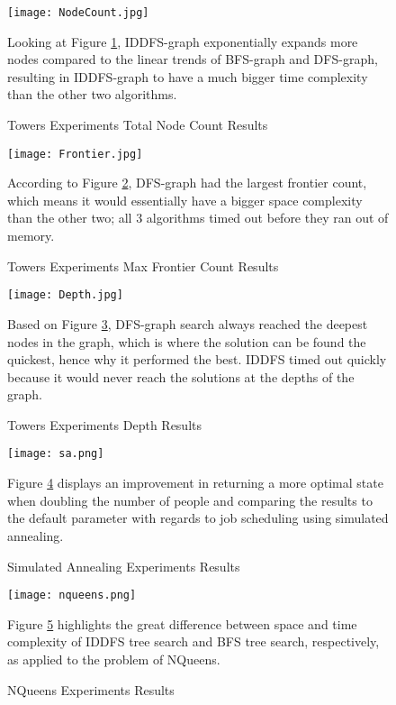 \documentclass[11pt]{article}
\begin{document}
\begin{figure}[!h]
{\centering
\texttt{[image: NodeCount.jpg]}
\caption{Towers Experiments Total Node Count Results}
\label{tower_node}
}
\vspace*{5mm}
Looking at Figure \ref{tower_node}, IDDFS-graph exponentially expands more nodes compared to the linear trends of BFS-graph and DFS-graph, resulting in IDDFS-graph to have a much bigger time complexity than the other two algorithms.\\
\end{figure}



\begin{figure}[!h]
{\centering
\texttt{[image: Frontier.jpg]}
\caption{Towers Experiments Max Frontier Count Results}
\label{tower_frontier}
}
\vspace*{5mm}
According to Figure \ref{tower_frontier}, DFS-graph had the largest frontier count, which means it would essentially have a bigger space complexity than the other two; all 3 algorithms timed out before they ran out of memory.\\
\end{figure}



\begin{figure}[!h]
{\centering
\texttt{[image: Depth.jpg]}
\caption{Towers Experiments Depth Results}
\label{tower_depth}
}
\vspace*{5mm}
Based on Figure \ref{tower_depth}, DFS-graph search always reached the deepest nodes in the graph, which is where the solution can be found the quickest, hence why it performed the best. IDDFS timed out quickly because it would never reach the solutions at the depths of the graph.\\
\end{figure}


\begin{figure}[!h]
{\centering
\texttt{[image: sa.png]}
\caption{Simulated Annealing Experiments Results}
\label{sa}
}
 \vspace*{5mm}
Figure \ref{sa} displays an improvement in returning a more optimal state when doubling the number of people and comparing the results to the default parameter with regards to job scheduling using simulated annealing.\\
\end{figure}

\begin{figure}[!h]
{\centering
\texttt{[image: nqueens.png]}
\caption{NQueens Experiments Results}
\label{nqueens}
}
 \vspace*{5mm}
Figure \ref{nqueens} highlights the great difference between space and time complexity of IDDFS tree search and BFS tree search, respectively, as applied to the problem of NQueens.\\
\end{figure}
\end{document}
